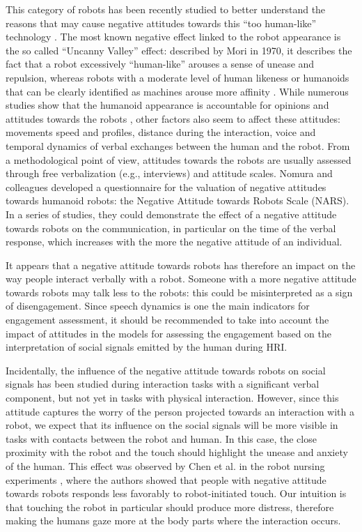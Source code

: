 This category of robots has been recently studied to better understand the reasons that may cause negative attitudes towards this ``too human-like'' technology \cite{Saygin2012}. 
The most known negative effect linked to the robot appearance is the so called ``Uncanny Valley'' effect: described by Mori in 1970, it describes the fact that a robot excessively ``human-like'' arouses a sense of unease and repulsion, whereas robots with a moderate level of human likeness or humanoids that can be clearly identified as machines arouse more affinity \cite{UncannyRAM2012}.
While numerous studies show that the humanoid appearance is accountable for opinions and attitudes towards the robots \cite{Gray2012}, other factors also seem to affect these attitudes: movements speed and profiles, distance during the interaction, voice and temporal dynamics of verbal exchanges between the human and the robot. 
From a methodological point of view, attitudes towards the robots are usually assessed through  free verbalization (e.g., interviews) and attitude scales.
Nomura and colleagues \cite{Nomura2006nars,NARS2006} developed a questionnaire for the valuation of negative attitudes towards humanoid robots: the Negative Attitude towards Robots Scale (NARS). In a series of studies, they could demonstrate the effect of a negative attitude towards robots on the communication, in particular on the time of the verbal response, which increases with the more the negative attitude of an individual.

It appears that a negative attitude towards robots has therefore an impact on the way people interact verbally with a robot. Someone with a more negative attitude towards robots may talk less to the robots: this could be misinterpreted as a sign of disengagement.
Since speech dynamics is one the main indicators for engagement assessment, it should be recommended to take into account the impact of attitudes in the models for assessing the engagement based on the interpretation of social signals emitted by the human during HRI.

Incidentally, the influence of the negative attitude towards robots on social signals has been studied during interaction tasks with a significant verbal component, but not yet in tasks with physical interaction. 
However, since this attitude captures the worry of the person projected towards an interaction with a robot, we expect that its influence on the social signals will be more visible in tasks with contacts between the robot and human. 
In this case, the close proximity with the robot and the touch should highlight the unease and anxiety of the human.
This effect was observed by Chen et al. in the robot nursing experiments \cite{Chen2014NARStouch}, where the authors showed that people with negative attitude towards robots responds less favorably to robot-initiated touch. 
Our intuition is that touching the robot in particular should produce more distress, therefore making the humans gaze more at the body parts where the interaction occurs.


